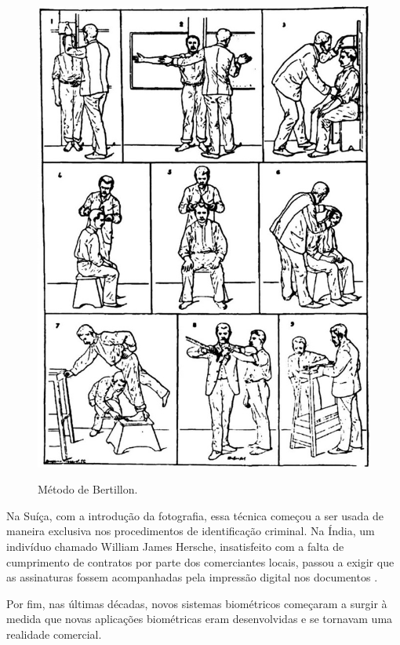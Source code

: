 \begin{figure}[h!]
    \centering
    \caption{Método de Bertillon.}
    \includegraphics[scale=0.25]{figuras/bertillon.jpg} 
    \label{fig:bertillon}
    \centering
\end{figure}

Na Suíça, com a introdução da fotografia, essa técnica começou a ser 
usada de maneira exclusiva nos procedimentos de identificação 
criminal. Na Índia, um indivíduo chamado William James Hersche, 
insatisfeito com a falta de cumprimento de contratos por parte 
dos comerciantes locais, passou a exigir que as assinaturas 
fossem acompanhadas pela impressão digital nos documentos \cite{boechat2008}.

Por fim, nas últimas décadas, novos sistemas biométricos começaram a surgir 
à medida que novas aplicações biométricas eram desenvolvidas e se tornavam 
uma realidade comercial.

